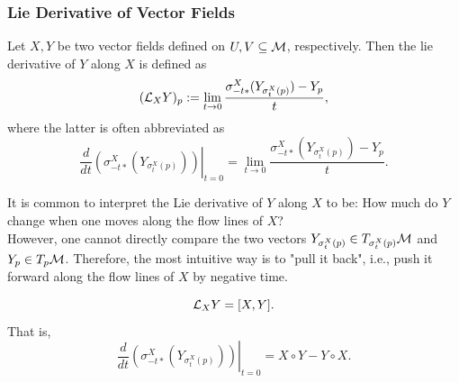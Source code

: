 \documentclass[../main.tex]{subfiles}
\begin{document}
    \subsubsection{Lie Derivative of Vector Fields}
    \begin{definition}\label{def:lie-derivative}
        Let \(X, Y\) be two vector fields defined on \(U, V \subseteq 
        \manifold[M]\), respectively. Then the lie derivative of \(Y\) 
        along \(X\) is defined as 
        \[
        (\lder{X}Y)_p := 
        \lim_{t \to 0} \frac{\sigma^X_{-t*}(Y_{\sigma^X_t(p)}) - Y_p}{t},
        \]
        where the latter is often abbreviated as 
        \[
        \left.\frac{d}{dt}(\sigma_{-t*}^X(Y_{\sigma^X_t(p)}))\right|_{t=0}=
        \lim_{t \to 0} \frac{\sigma^X_{-t*}(Y_{\sigma^X_t(p)}) - Y_p}{t}.
        \]
    \end{definition}
    \begin{remark}
        It is common to interpret the Lie derivative of \(Y\) along \(X\) to 
        be: How much do \(Y\) change when one moves along the flow lines of 
        \(X\)? \\
        However, one cannot directly compare the two vectors \(Y_{\sigma^X_t(p)}
        \in T_{\sigma^X_t(p)}\manifold[M]\) and \(Y_p \in T_p\manifold[M]\). 
        Therefore, the most intuitive way is to "pull it back", i.e., push it 
        forward along the flow lines of \(X\) by negative time.
    \end{remark}
    \begin{theorem}\label{thm:lie-bracket-flow}
        \[
        \lder{X}Y = [X, Y].
        \]
        That is, 
        \[
        \left.\frac{d}{dt}(\sigma_{-t*}^X(Y_{\sigma^X_t(p)}))\right|_{t=0}
        = X\circ Y - Y \circ X.
        \]
    \end{theorem}
\end{document}
